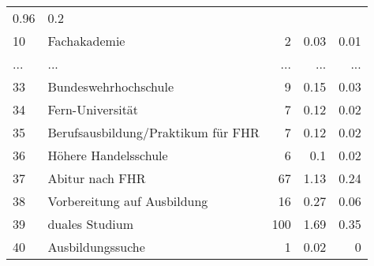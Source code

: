 \begin{longtable}{lXrrr}
          \num[round-mode=places,round-precision=2]{0,96} &
          \num[round-mode=places,round-precision=2]{0,2} \\
        10 & \multicolumn{1}{X}{Fachakademie} & %
          \num{2} &
          \num[round-mode=places,round-precision=2]{0,03} &
          \num[round-mode=places,round-precision=2]{0,01} \\
       ... & ... & ... & ... & ... \\
        33 & \multicolumn{1}{X}{Bundeswehrhochschule} & %
          \num{9} &
          \num[round-mode=places,round-precision=2]{0,15} &
          \num[round-mode=places,round-precision=2]{0,03} \\

        34 & \multicolumn{1}{X}{Fern-Universität} & %
          \num{7} &
          \num[round-mode=places,round-precision=2]{0,12} &
          \num[round-mode=places,round-precision=2]{0,02} \\

        35 & \multicolumn{1}{X}{Berufsausbildung/Praktikum für FHR} & %
          \num{7} &
          \num[round-mode=places,round-precision=2]{0,12} &
          \num[round-mode=places,round-precision=2]{0,02} \\

        36 & \multicolumn{1}{X}{Höhere Handelsschule} & %
          \num{6} &
          \num[round-mode=places,round-precision=2]{0,1} &
          \num[round-mode=places,round-precision=2]{0,02} \\

        37 & \multicolumn{1}{X}{Abitur nach FHR} & %
          \num{67} &
          \num[round-mode=places,round-precision=2]{1,13} &
          \num[round-mode=places,round-precision=2]{0,24} \\

        38 & \multicolumn{1}{X}{Vorbereitung auf Ausbildung} & %
          \num{16} &
          \num[round-mode=places,round-precision=2]{0,27} &
          \num[round-mode=places,round-precision=2]{0,06} \\

        39 & \multicolumn{1}{X}{duales Studium} & %
          \num{100} &
          \num[round-mode=places,round-precision=2]{1,69} &
          \num[round-mode=places,round-precision=2]{0,35} \\

        40 & \multicolumn{1}{X}{Ausbildungssuche} & %
          \num{1} &
          \num[round-mode=places,round-precision=2]{0,02} &
          \num[round-mode=places,round-precision=2]{0} \\


\end{longtable}
